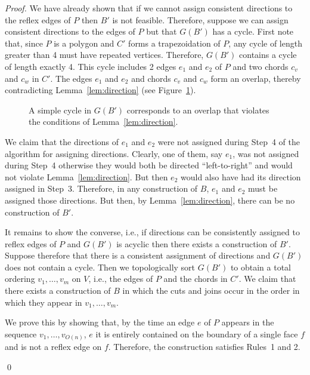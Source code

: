 \documentclass{elsart}
\newenvironment{proof}{\emph{Proof.}}{\qed}
\begin{document}
\begin{proof}
  We have already shown that if we cannot assign consistent directions
  to the reflex edges of $P$ then $B'$ is not feasible.  Therefore,
  suppose we can assign consistent directions to the edges of $P$ but
  that $G(B')$ has a cycle. First note that, since $P$ is a polygon
  and $C'$ forms a trapezoidation of $P$, any cycle of length greater
  than 4 must have repeated vertices.  Therefore, $G(B')$ contains a
  cycle of length exactly 4.  This cycle includes 2 edges $e_1$ and
  $e_2$ of $P$ and two chords $c_v$ and $c_w$ in $C'$.  The edges
  $e_1$ and $e_2$ and chords $c_v$ and $c_w$ form an overlap, thereby
  contradicting Lemma~\ref{lem:direction} (see
  Figure~\ref{fig:cycle}).
  
  \begin{figure}
    \begin{center}
    \end{center}
    \caption{A simple cycle in $G(B')$ corresponds to an overlap that
      violates the conditions of Lemma~\ref{lem:direction}.}
    \label{fig:cycle}
  \end{figure}
  
  We claim that the directions of $e_1$ and $e_2$ were not assigned
  during Step~4 of the algorithm for assigning directions.  Clearly,
  one of them, say $e_1$, was not assigned during Step~4 otherwise
  they would both be directed ``left-to-right'' and would not violate
  Lemma~\ref{lem:direction}.  But then $e_2$ would also have had its
  direction assigned in Step~3.  Therefore, in any construction of
  $B$, $e_1$ and $e_2$ must be assigned those directions. But then, by
  Lemma~\ref{lem:direction}, there can be no construction of $B'$.
  
  It remains to show the converse, i.e., if directions can be
  consistently assigned to reflex edges of $P$ and $G(B')$ is acyclic
  then there exists a construction of $B'$.  Suppose therefore that
  there is a consistent assignment of directions and $G(B')$ does not
  contain a cycle. Then we topologically sort $G(B')$ to obtain a
  total ordering $v_1,\ldots,v_m$ on $V$, i.e., the edges of $P$
  and the chords in $C'$.  We claim that there exists a construction
  of $B$ in which the cuts and joins occur in the order in which they
  appear in $v_1,\ldots,v_m$.
  
  We prove this by showing that, by the time an edge $e$ of $P$ appears in the
  sequence $v_1,\ldots,v_{O(n)}$, $e$ it is entirely contained on the boundary
  of a single face $f$ and is not a reflex edge on $f$.  Therefore, the
  construction satisfies Rules~1 and 2.
  

\end{proof}
\end{document}
